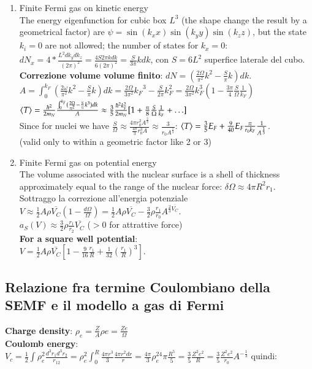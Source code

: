 \documentclass[main.tex]{subfiles}
\begin{document}
\begin{enumerate}
\item Finite Fermi gas on kinetic energy\\
The energy eigenfunction for cubic box $L^3$ (the shape change the result by a geometrical factor)  are $\psi=\sin{(k_xx)}\sin{(k_yy)}\sin{(k_zz)}$, but the state $k_i=0$ are not allowed; the number of states for $k_x=0$: $dN_x=4*\frac{L^2dk_ydk_z}{(2\pi)^2}=\frac{4S2\pi kdk}{6(2\pi)^2}=\frac{S}{3\pi}kdk$, con $S=6L^2$ superfice laterale del cubo.\\
\textbf{Correzione volume volume finito}: $dN=(\frac{2\Omega}{\pi^2}k^2-\frac{S}{\pi}k)dk$.
$A=\int_0^{k_F}(\frac{2\omega}{\pi^2}k^2-\frac{S}{\pi}k)dk=\frac{2\Omega}{3\pi^2}{k_F}^3-\frac{S}{2\pi}k_F^2=\frac{2\Omega}{3\pi^2}k_F^3(1-\frac{3\pi}{4}\frac{S}{\Omega}\frac{1}{k_F})$\\
$\langle T \rangle=\frac{\hbar^2}{2m_N}\frac{\int_0^{k_F}(\frac{2\Omega}{\pi^2}-\frac{S}{\pi}k^3)dk}{A}\approx\frac{3}{5}\frac{\hbar^2k_F^2}{2m_N}[1+\frac{\pi}{8}\frac{S}{\Omega}\frac{1}{k_F}+\ldots]$\\
Since for nuclei we have $\frac{S}{\Omega}\approx\frac{4\pi r_0^2A^{\frac{2}{3}}}{\frac{4\pi}{3}r_0^3A}\approx\frac{3}{r_0A^{\frac{1}{3}}}$: $\langle T \rangle=\frac{3}{5}E_F+\frac{9}{40}E_F\frac{\pi}{r_0k_F}\frac{1}{A^{\frac{1}{3}}}$.\\
 (valid only to within a geometric factor like 2 or 3)\\

\item Finite Fermi gas on potential energy\\
The volume associated with the nuclear surface is a shell of thickness approximately equal to the range of the nuclear force: $\delta\Omega\approx4\pi R^2r_1$.\\
Sottraggo la correzione all'energia potenziale $V\approx\frac{1}{2}A\rho\overline{V_C}(1-\frac{d\Omega}{\Omega})=\frac{1}{2}A\rho\overline{V_C}-\frac{3}{2}\rho\frac{r_1}{r_0}A^{\frac{2}{3}\overline{V_C}}$.\\
$a_S(V)\approx\frac{3}{2}\rho\frac{r_1}{r_2}\overline{V_C}$ ($>0$ for attrattive force)\\
\textbf{For a square well potential}:\\
$V=\frac{1}{2}A\rho\overline{V_C}[1-\frac{9}{16}\frac{r_1}{R}+\frac{1}{32}(\frac{r_1}{R})^3]$.
\end{enumerate}

\subsection{Relazione fra termine Coulombiano della SEMF e il modello a gas di Fermi}
\textbf{Charge density}: $\rho_e=\frac{Z}{A}\rho e=\frac{Ze}{\Omega}$\\
\textbf{Coulomb energy}: $V_c=\frac{1}{2}\int\rho_e^2\frac{d^3r_1d^3r_2}{r_{12}}=\rho_e^2\int_0^R\frac{4\pi r^3}{3}\frac{4\pi r^2dr}{r}=\frac{4\pi}{3}\rho_e^24\pi\frac{R^5}{5}=\frac{3}{5}\frac{Z^2e^2}{R}=\frac{3}{5}\frac{Z^2e^2}{r_0}A^{-\frac{1}{3}}$ quindi:\\
\end{document}
